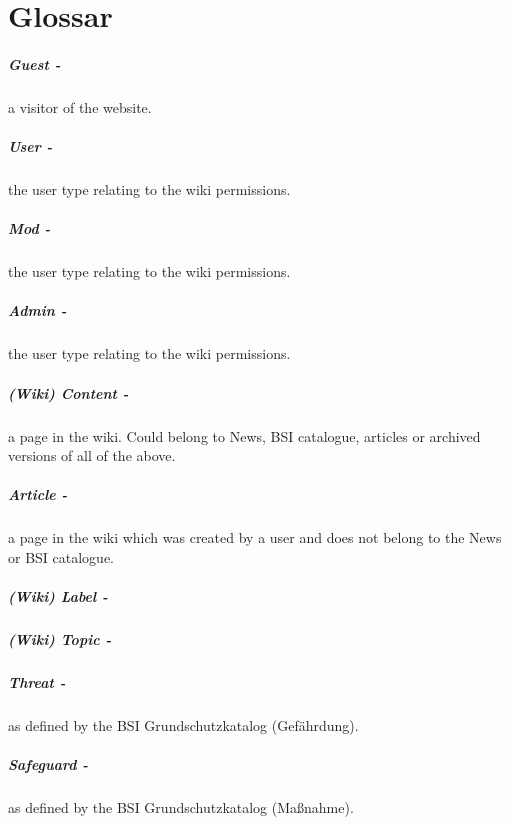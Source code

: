 \appendix
\chapter{Glossar}

\paragraph{Guest -} a visitor of the website.
\paragraph{User -} the user type relating to the wiki permissions.
\paragraph{Mod -} the user type relating to the wiki permissions. 
\paragraph{Admin -} the user type relating to the wiki permissions. 
\paragraph{(Wiki) Content -} a page in the wiki. Could belong to News, BSI catalogue, articles or archived versions of all of the above.
\paragraph{Article -} a page in the wiki which was created by a user and does not belong to the News or BSI catalogue.
\paragraph{(Wiki) Label -}
\paragraph{(Wiki) Topic -}
\paragraph{Threat -} as defined by the BSI Grundschutzkatalog (Gef\"ahrdung).
\paragraph{Safeguard -} as defined by the BSI Grundschutzkatalog (Ma\ss nahme).
